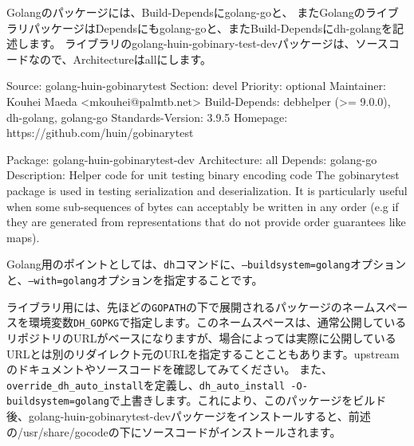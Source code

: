 \documentclass[mingoth,a4paper]{jsarticle}
\begin{document}
Golangのパッケージには、Build-Dependsにgolang-goと、
またGolangのライブラリパッケージはDependsにもgolang-goと、またBuild-Dependsにdh-golangを記述します。
ライブラリのgolang-huin-gobinary-test-devパッケージは、ソースコードなので、Architectureはallにします。

\begin{commandline}
Source: golang-huin-gobinarytest
Section: devel
Priority: optional
Maintainer: Kouhei Maeda <mkouhei@palmtb.net>
Build-Depends: debhelper (>= 9.0.0), dh-golang, golang-go
Standards-Version: 3.9.5
Homepage: https://github.com/huin/gobinarytest

Package: golang-huin-gobinarytest-dev
Architecture: all
Depends: golang-go
Description: Helper code for unit testing binary encoding code
 The gobinarytest package is used in testing serialization and
 deserialization. It is particularly useful when some sub-sequences of bytes
 can acceptably be written in any order (e.g if they are generated from
 representations that do not provide order guarantees like maps).
\end{commandline}

Golang用のポイントとしては、\texttt{dh}コマンドに、\texttt{--buildsystem=golang}オプションと、\texttt{--with=golang}オプションを指定することです。

ライブラリ用には、先ほどの\texttt{GOPATH}の下で展開されるパッケージのネームスペースを環境変数\texttt{DH\_GOPKG}で指定します。このネームスペースは、通常公開しているリポジトリのURLがベースになりますが、場合によっては実際に公開しているURLとは別のリダイレクト元のURLを指定することこともあります。upstreamのドキュメントやソースコードを確認してみてください。
また、\texttt{override\_dh\_auto\_install}を定義し、\texttt{dh\_auto\_install -O-buildsystem=golang}で上書きします。これにより、このパッケージをビルド後、golang-huin-gobinarytest-devパッケージをインストールすると、前述の/usr/share/gocodeの下にソースコードがインストールされます。

\end{document}
